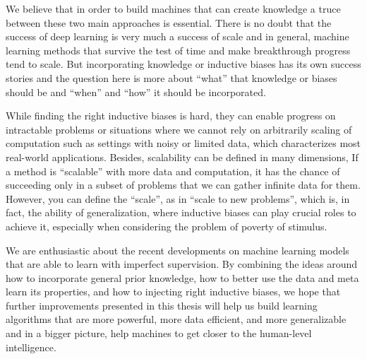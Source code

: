 We believe that in order to build machines that can create knowledge a truce between these two main approaches is essential.
There is no doubt that the success of deep learning is very much a success of scale and in general, machine learning methods that survive the test of time and make breakthrough progress tend to scale.
But incorporating knowledge or inductive biases has its own success stories and the question here is more about ``what'' that knowledge or biases should be and ``when'' and ``how'' it should be incorporated. 

While finding the right inductive biases is hard, they can enable progress on intractable problems or situations where we cannot rely on arbitrarily scaling of computation such as settings with noisy or limited data, which characterizes most real-world applications. 
Besides, scalability can be defined in many dimensions, If a method is ``scalable'' with more data and computation, it has the chance of succeeding only in a subset of problems that we can gather infinite data for them. 
However, you can define the ``scale'', as in ``scale to new problems'', which is, in fact, the ability of generalization, where inductive biases can play crucial roles to achieve it, especially when considering the problem of poverty of stimulus.


\bigskip
We are enthusiastic about the recent developments on machine learning models that are able to learn with imperfect supervision. 
By combining the ideas around how to incorporate general prior knowledge, how to better use the data and meta learn its properties, and how to injecting right inductive biases, we hope that further improvements presented in this thesis will help us build learning algorithms that are more powerful, more data efficient, and more generalizable and in a bigger picture, help machines to get closer to the human-level intelligence. 
